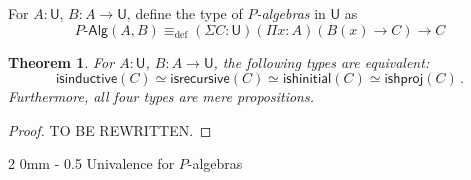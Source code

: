 \documentclass[reqno,10pt,a4paper,oneside]{amsart}
\makeatletter
\numberwithin{equation}{section}
\renewcommand{\subsection}{\@startsection
  {subsection}%
  {2}%
  {0mm}%
  {-\baselineskip}%
  {0.5\baselineskip}%
  {\normalfont\normalsize\bf}}%
\theoremstyle{mythm}
\newtheorem{theorem}{Theorem}[subsection]
\theoremstyle{mydef}
\theoremstyle{myrmk}
\newcommand{\deq}{\equiv}
\newcommand{\defeq}{\deq_{\mathrm{def}}}
\newcommand{\UU}{\mathsf{U}}
\newcommand{\Palg}{P\text{-}\mathsf{Alg}}
\makeatother
\begin{document}

For $A:\UU$, $B : A \to \UU$, define the type of \emph{$P$-algebras} in $\UU$ as
\[
\Palg(A,B)  \defeq (\Sigma C : \UU) (\Pi x :A) (B(x) \to C) \to C 
\]



\begin{theorem}\label{lem:WMainInt}
For $A : \UU$, $B : A \to \UU$, the following types are equivalent: 
\[ 
\mathsf{isinductive}(C) \simeq 
\mathsf{isrecursive}(C)   \simeq
\mathsf{ishinitial}(C) \simeq
\mathsf{ishproj}(C) \, .
\]
Furthermore, all four types are mere propositions.
\end{theorem}


\begin{proof} TO BE REWRITTEN.
\end{proof}




\subsection{Univalence for $P$-algebras}
\end{document}
